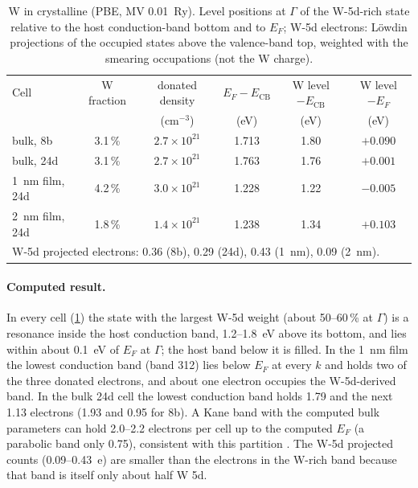 \begin{table}[htbp]\centering\small
\caption{W in crystalline \InO{} (PBE, MV 0.01~Ry). Level positions at $\Gamma$ of the W-5d-rich state relative to the
host conduction-band bottom and to $E_F$; W-5d electrons: L\"owdin projections of the occupied states above the
valence-band top, weighted with the smearing occupations (not the W charge).   }
\label{tab:mono-w-cells}
\begin{tabular}{lccccc}\toprule
Cell & W fraction & donated density & $E_F - E_{\mathrm{CB}}$ & W level $- E_{\mathrm{CB}}$ & W level $- E_F$ \\
 & & (cm$^{-3}$) & (eV) & (eV) & (eV) \\\midrule
bulk, 8b & 3.1\,\% & $2.7\times10^{21}$ & 1.713 & 1.80 & $+0.090$ \\
bulk, 24d & 3.1\,\% & $2.7\times10^{21}$ & 1.763 & 1.76 & $+0.001$ \\
1~nm film, 24d & 4.2\,\% & $3.0\times10^{21}$ & 1.228 & 1.22 & $-0.005$ \\
2~nm film, 24d & 1.8\,\% & $1.4\times10^{21}$ & 1.238 & 1.34 & $+0.103$ \\\midrule
\multicolumn{6}{l}{W-5d projected electrons: 0.36 (8b), 0.29 (24d), 0.43 (1~nm), 0.09 (2~nm).} \\\bottomrule
\end{tabular}
\end{table}

\paragraph{Computed result.} In every cell (\cref{tab:mono-w-cells}) the state with the largest W-5d weight
(about 50--60\,\% at $\Gamma$) is a resonance inside the host conduction band, 1.2--1.8~eV above its bottom, and lies
within about 0.1~eV of $E_F$ at $\Gamma$; the host band below it is filled. In the 1~nm film the lowest conduction band
(band 312) lies below $E_F$ at every $k$ and holds two of the three donated electrons, and about one electron occupies the
W-5d-derived band. In the bulk 24d cell the lowest conduction band holds 1.79 and the next 1.13 electrons (1.93 and 0.95
for 8b). A Kane band with the computed bulk parameters can hold 2.0--2.2 electrons per cell up to the computed $E_F$
(a parabolic band only 0.75), consistent with this partition . The W-5d projected counts (0.09--0.43~e) are
smaller than the electrons in the W-rich band because that band is itself only about half W 5d.

